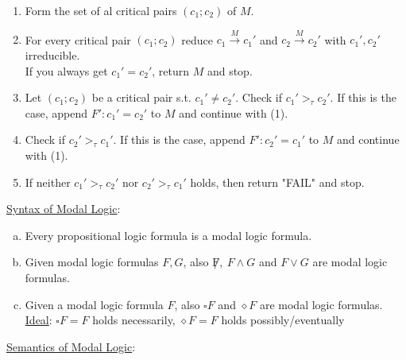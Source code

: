 \documentclass[a4paper]{article}
\newcommand{\ul}{\underline}
\begin{document}
\begin{enumerate}[(1)]
	\item Form the set of al critical pairs $(c_1;c_2)$ of $M$.
	\item For every critical pair $(c_1;c_2)$ reduce $c_1\overset{M}{\rightarrow} c_1'$ and $c_2\overset{M}{\rightarrow} c_2'$ with $c_1',c_2'$ irreducible.\\
	If you always get $c_1'=c_2'$, return $M$ and stop.
	\item Let $(c_1;c_2)$ be a critical pair s.t. $c_1'\neq c_2'$. Check if $c_1'>_\tau c_2'$. If this is the case, append $F':c_1'=c_2'$ to $M$ and continue with (1).
	\item Check if $c_2'>_\tau c_1'$. If this is the case, append $F':c_2'=c_1'$ to $M$ and continue with (1).
	\item If neither $c_1'>_\tau c_2'$ nor $c_2'>_\tau c_1'$ holds, then return "FAIL" and stop.
\end{enumerate}
\ul{Syntax of Modal Logic}:
\begin{enumerate}[(a)]
	\item Every propositional logic formula is a modal logic formula.
	\item Given modal logic formulas $F,G$, also $\not F,\ F\wedge G$ and $F\vee G$ are modal logic formulas.
	\item Given a modal logic formula $F$, also $\square F$ and $\diamond F$ are modal logic formulas.\\
	\ul{Ideal}: $\square F=F$ holds necessarily, $\diamond F=F$ holds possibly/eventually
\end{enumerate}
\ul{Semantics of Modal Logic}:
\end{document}
